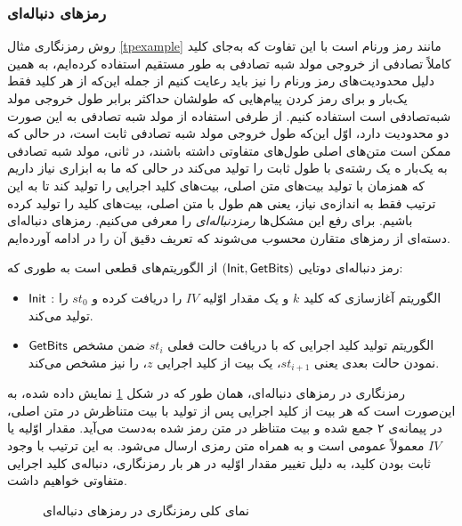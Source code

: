 \subsubsection*{رمزهای دنباله‌ای}
روش رمزنگاری مثال 
\ref{tpexample}
مانند رمز ورنام است با این تفاوت که به‌جای کلید کاملاً تصادفی از خروجی مولد  شبه تصادفی به طور مستقیم استفاده کرده‌ایم، به همین دلیل  محدودیت‌های رمز ورنام را نیز باید رعایت کنیم از جمله این‌که از هر کلید فقط یک‌بار و برای رمز کردن پیام‌هایی که طولشان حداکثر برابر طول خروجی مولد  شبه‌تصادفی است استفاده کنیم. از طرفی استفاده از مولد  شبه تصادفی به این صورت دو محدودیت دارد، اوّل این‌که طول خروجی مولد  شبه تصادفی ثابت است، در حالی که ممکن است متن‌های اصلی طول‌های متفاوتی داشته باشند، در ثانی، مولد  شبه تصادفی به یک‌بار ه یک رشته‌ی با طول ثابت را تولید می‌کند در حالی که ما به ابزاری نیاز داریم که همزمان با تولید بیت‌های متن اصلی، بیت‌های کلید اجرایی را تولید کند تا به این‌ ترتیب فقط به اندازه‌ی نیاز، یعنی هم طول با متن اصلی، بیت‌های کلید را تولید کرده باشیم. برای رفع این مشکل‌ها 
\textit{رمزدنباله‌ای }
را معرفی می‌کنیم. رمزهای دنباله‌ای دسته‌ای از رمزهای متقارن محسوب می‌شوند که تعریف دقیق آن را در ادامه آورده‌ایم.

\begin{definition}
رمز دنباله‌ای
دوتایی 
$(\mathsf{Init}, \mathsf{GetBits})$
از الگوریتم‌های قطعی است به طوری که:
\begin{itemize}
\item
$\mathsf{Init}$
: الگوریتم آغازسازی
که کلید 
$k$
و یک مقدار اوّلیه‌
$IV$
را دریافت کرده و 
$st_{0}$
را تولید می‌کند.
\item
$\mathsf{GetBits}$
الگوریتم تولید کلید اجرایی که با دریافت حالت فعلی
$st_{i}$
ضمن مشخص نمودن حالت بعدی یعنی 
$st_{i+1}$،
 یک بیت از کلید اجرایی 
$z$، 
را نیز مشخص می‌کند. 
\end{itemize}
\end{definition}
رمزنگاری در رمزهای دنباله‌ای، همان طور که در شکل 
\ref{stream_cipher_overview}
نمایش داده شده، به این‌صورت است که هر بیت از کلید اجرایی پس از تولید با بیت متناظرش در متن اصلی، در پیمانه‌ی ۲ جمع شده و بیت متناظر در متن رمز شده به‌دست  می‌آید.  مقدار اوّلیه  یا 
$IV$
معمولاً عمومی است و به همراه متن رمزی ارسال می‌شود. به این ترتیب با وجود ثابت بودن کلید، به دلیل تغییر مقدار اوّلیه در هر بار رمزنگاری، دنباله‌ی کلید اجرایی متفاوتی خواهیم داشت.
\begin{figure}
\begin{center}
   
\end{center}
\caption{نمای کلی رمزنگاری در رمزهای دنباله‌ای}
\label{stream_cipher_overview}
\end{figure}

